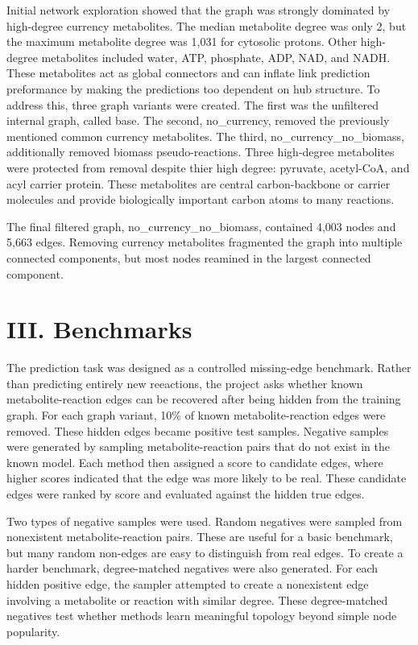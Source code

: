 \documentclass[reprint,preprintnumbers,amsmath,amssymb,aps,nofootinbib,showkeys]{revtex4-2}
\begin{document}
    Initial network exploration showed that the graph was strongly dominated by high-degree currency metabolites. The median metabolite degree was only 2, but the maximum metabolite degree was 1,031 for cytosolic protons. Other high-degree metabolites included water, ATP, phosphate, ADP, NAD, and NADH. These metabolites act as global connectors and can inflate link prediction preformance by making the predictions too dependent on hub structure. To address this, three graph variants were created. The first was the unfiltered internal graph, called base. The second, no\_currency, removed the previously mentioned common currency metabolites. The third, no\_currency\_no\_biomass, additionally removed biomass pseudo-reactions. Three high-degree metabolites were protected from removal despite thier high degree: pyruvate, acetyl-CoA, and acyl carrier protein. These metabolites are central carbon-backbone or carrier molecules and provide biologically important carbon atoms to many reactions. 

    The final filtered graph, no\_currency\_no\_biomass, contained 4,003 nodes and 5,663 edges. Removing currency metabolites fragmented the graph into multiple connected components, but most nodes reamined in the largest connected component. 


\section{III. Benchmarks}

    The prediction task was designed as a controlled missing-edge benchmark. Rather than predicting entirely new reeactions, the project asks whether known metabolite-reaction edges can be recovered after being hidden from the training graph. For each graph variant, 10\% of known metabolite-reaction edges were removed. These hidden edges became positive test samples. Negative samples were generated by sampling metabolite-reaction pairs that do not exist in the known model. Each method then assigned a score to candidate edges, where higher scores indicated that the edge was more likely to be real. These candidate edges were ranked by score and evaluated against the hidden true edges. 

    Two types of negative samples were used. Random negatives were sampled from nonexistent metabolite-reaction pairs. These are useful for a basic benchmark, but many random non-edges are easy to distinguish from real edges. To create  a harder benchmark, degree-matched negatives were also generated. For each hidden positive edge, the sampler attempted to create a nonexistent edge involving a metabolite or reaction with similar degree. These degree-matched negatives test whether methods learn meaningful topology beyond simple node popularity.
\end{document}

